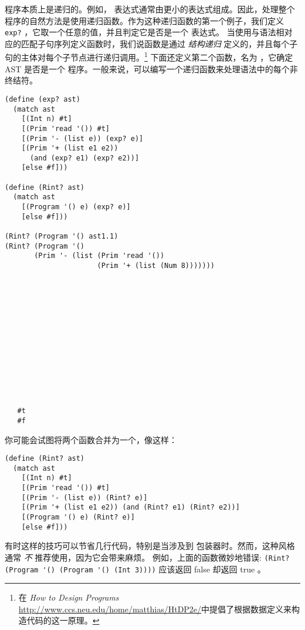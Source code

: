 \documentclass[11pt]{book}
\begin{document}
程序本质上是递归的。例如， \LangInt{} 表达式通常由更小的表达式组成。因此，处理整个程序的自然方法是使用递归函数。作为这种递归函数的第一个例子，我们定义 \texttt{exp?} ，它取一个任意的值，并且判定它是否是一个 \LangInt{}表达式。
%
当使用与语法相对应的匹配子句序列定义函数时，我们说函数是通过 \emph{结构递归} 定义的，并且每个子句的主体对每个子节点进行递归调用。\footnote{在 \emph{How to Design
    Programs} \url{http://www.ccs.neu.edu/home/matthias/HtDP2e/}中提倡了根据数据定义来构造代码的这一原理。} 
下面还定义第二个函数，名为  ，它确定 AST 是否是一个 \LangInt{} 程序。一般来说，可以编写一个递归函数来处理语法中的每个非终结符。
%
\begin{center}
\begin{minipage}{0.7\textwidth}
\begin{lstlisting}
(define (exp? ast)
  (match ast
    [(Int n) #t]
    [(Prim 'read '()) #t]
    [(Prim '- (list e)) (exp? e)]
    [(Prim '+ (list e1 e2))
      (and (exp? e1) (exp? e2))]
    [else #f]))

(define (Rint? ast)
  (match ast
    [(Program '() e) (exp? e)]
    [else #f]))

(Rint? (Program '() ast1.1)
(Rint? (Program '()
       (Prim '- (list (Prim 'read '())
                      (Prim '+ (list (Num 8)))))))
\end{lstlisting}
\end{minipage}
\vrule
\begin{minipage}{0.25\textwidth}
\begin{lstlisting}













   #t
   #f
\end{lstlisting}
\end{minipage}
\end{center}


你可能会试图将两个函数合并为一个，像这样：
\begin{center}
\begin{minipage}{0.5\textwidth}
\begin{lstlisting}
(define (Rint? ast)
  (match ast
    [(Int n) #t]
    [(Prim 'read '()) #t]
    [(Prim '- (list e)) (Rint? e)]
    [(Prim '+ (list e1 e2)) (and (Rint? e1) (Rint? e2))]
    [(Program '() e) (Rint? e)]
    [else #f]))
\end{lstlisting}
\end{minipage}
\end{center}
%
有时这样的技巧可以节省几行代码，特别是当涉及到  包装器时。然而，这种风格通常
\emph{不} 推荐使用，因为它会带来麻烦。
%
例如，上面的函数微妙地错误:
\lstinline{(Rint? (Program '() (Program '() (Int 3))))}
应该返回 false 却返回 true 。
\end{document}
